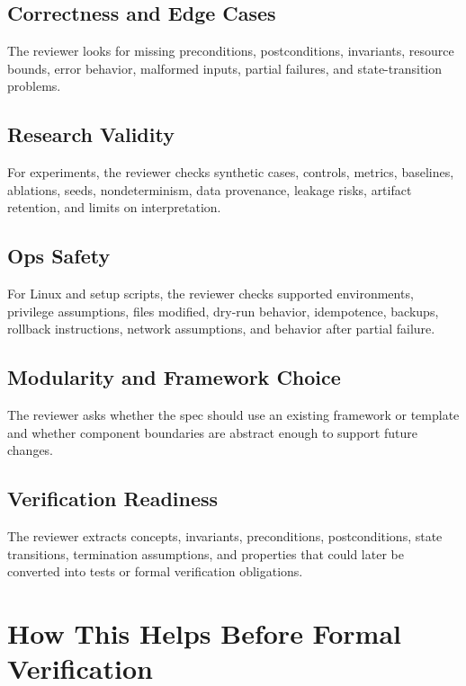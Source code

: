 \documentclass[11pt]{article}
\begin{document}
\subsection{Correctness and Edge Cases}

The reviewer looks for missing preconditions, postconditions, invariants,
resource bounds, error behavior, malformed inputs, partial failures, and
state-transition problems.

\subsection{Research Validity}

For experiments, the reviewer checks synthetic cases, controls, metrics,
baselines, ablations, seeds, nondeterminism, data provenance, leakage risks,
artifact retention, and limits on interpretation.

\subsection{Ops Safety}

For Linux and setup scripts, the reviewer checks supported environments,
privilege assumptions, files modified, dry-run behavior, idempotence, backups,
rollback instructions, network assumptions, and behavior after partial failure.

\subsection{Modularity and Framework Choice}

The reviewer asks whether the spec should use an existing framework or template
and whether component boundaries are abstract enough to support future changes.

\subsection{Verification Readiness}

The reviewer extracts concepts, invariants, preconditions, postconditions,
state transitions, termination assumptions, and properties that could later be
converted into tests or formal verification obligations.

\section{How This Helps Before Formal Verification}
\end{document}

